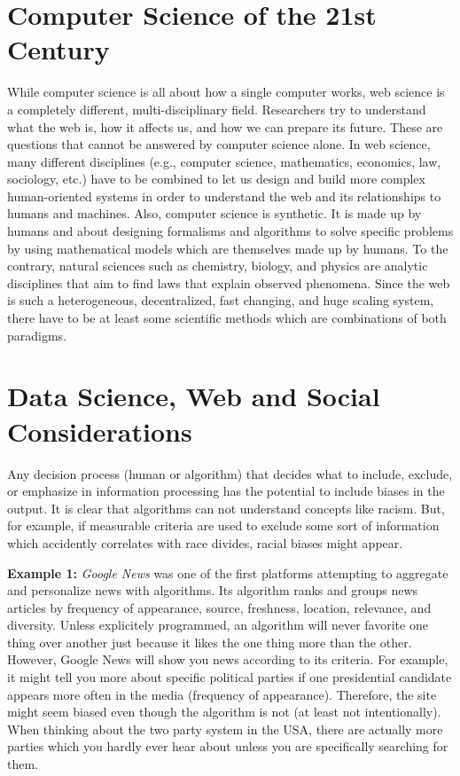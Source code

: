 \documentclass[a4paper]{article}
\begin{document}
\section{Computer Science of the 21st Century}
While computer science is all about how a single computer works, web science is a completely different, multi-disciplinary field.
Researchers try to understand what the web is, how it affects us, and how we can prepare its future.
These are questions that cannot be answered by computer science alone.
In web science, many different disciplines (e.g., computer science, mathematics, economics, law, sociology, etc.) have to be combined to let us design and build more complex human-oriented systems in order to understand the web and its relationships to humans and machines.
Also, computer science is synthetic.
It is made up by humans and about designing formalisms and algorithms to solve specific problems by using mathematical models which are themselves made up by humans.
To the contrary, natural sciences such as chemistry, biology, and physics are analytic disciplines that aim to find laws that explain observed phenomena.
Since the web is such a heterogeneous, decentralized, fast changing, and huge scaling system, there have to be at least some scientific methods which are combinations of both paradigms.

\section{Data Science, Web and Social Considerations}
Any decision process (human or algorithm) that decides what to include, exclude, or emphasize in information processing has the potential to include biases in the output.
It is clear that algorithms can not understand concepts like racism.
But, for example, if measurable criteria are used to exclude some sort of information which accidently correlates with race divides, racial biases might appear.

\textbf{Example 1:}
\emph{Google News} was one of the first platforms attempting to aggregate and personalize news with algorithms.
Its algorithm ranks and groups news articles by frequency of appearance, source, freshness, location, relevance, and diversity.
Unless explicitely programmed, an algorithm will never favorite one thing over another just because it likes the one thing more than the other.
However, Google News will show you news according to its criteria.
For example, it might tell you more about specific political parties if one presidential candidate appears more often in the media (frequency of appearance).
Therefore, the site might seem biased even though the algorithm is not (at least not intentionally).
When thinking about the two party system in the USA, there are actually more parties which you hardly ever hear about unless you are specifically searching for them.\\
\end{document}
